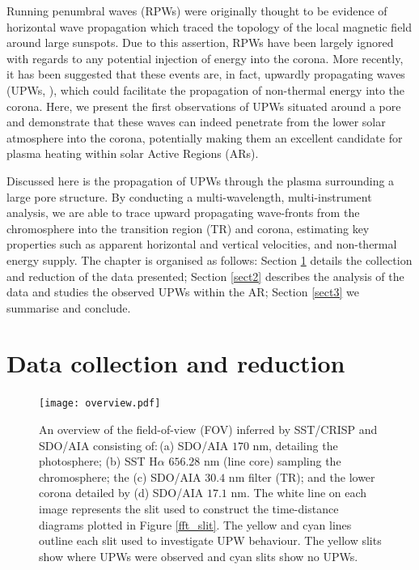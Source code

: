 	Running penumbral waves (RPWs) were originally thought to be evidence of horizontal wave propagation \citep{Zirin1972,Giovanelli1972,Bloomfiel2008} which traced the topology of the local magnetic field \citep{Zhugzhda1973,Nye1974} around large sunspots.
	Due to this assertion, RPWs have been largely ignored with regards to any potential injection of energy into the corona.
	More recently, it has been suggested that these events are, in fact, upwardly propagating waves (UPWs, \citealt{OASO,Bloomfiel2008,Jess2013}), which could facilitate the propagation of non-thermal energy into the corona.
	Here, we present the first observations of UPWs situated around a pore and demonstrate that these waves can indeed penetrate from the lower solar atmosphere into the corona, potentially making them an excellent candidate for plasma heating within solar Active Regions (ARs).

	Discussed here is the propagation of UPWs through the plasma surrounding a large pore structure.
	By conducting a multi-wavelength, multi-instrument analysis, we are able to trace upward propagating wave-fronts from the chromosphere into the transition region (TR) and corona, estimating key properties such as apparent horizontal and vertical velocities, and non-thermal energy supply.
	The chapter is organised as follows: Section \ref{sect1} details the collection and reduction of the data presented; Section \ref{sect2} describes the analysis of the data and studies the observed UPWs within the AR; Section \ref{sect3} we summarise and conclude.

\section{Data collection and reduction}
\label{sect1}

	\begin{figure}
		\centering
		\texttt{[image: overview.pdf]}
		\caption
		{
		An overview of the field-of-view (FOV) inferred by SST/CRISP and SDO/AIA consisting of:\,(a) SDO/AIA $170$ nm, detailing the photosphere; (b) SST H$\alpha$ $656.28$ nm (line core) sampling the chromosphere; the  (c) SDO/AIA $30.4$ nm filter (TR); and the lower corona detailed by (d) SDO/AIA $17.1$ nm.
		The white line on each image represents the slit used to construct the time-distance diagrams plotted in Figure \ref{fft_slit}.
		The yellow and cyan lines outline each slit used to investigate UPW behaviour.
	    The yellow slits show where UPWs were observed and cyan slits show no UPWs.
		}
		\label{chap5:overview}
	\end{figure}

